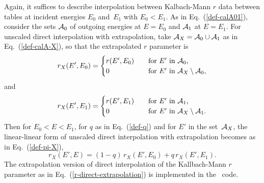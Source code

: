 {Again, it suffices to describe interpolation between Kalbach-Mann $r$
data between tables at incident energies $E_0$ and~$E_1$ with
$E_0 < E_1$.  As in Eq.~(\ref{def-calA01}),
consider the sets ${\cal A}_0$ of outgoing energies
at $E = E_0$ and ${\cal A}_1$ at $E = E_1$.  For unscaled direct interpolation
with extrapolation, take ${\cal A}_X = {\cal A}_0 \cup {\cal A}_1$ as in
Eq.~(\ref{def-calA-X}), so that the extrapolated $r$ parameter is
\begin{equation*}
  r_X(E', E_0 ) = \begin{cases}
    r(E', E_0 ) &\quad \text{for $E'$ in ${\cal A}_0$,} \\
    0 &\quad \text{for $E'$ in ${\cal A}_X \setminus {\cal A}_0$,}
  \end{cases}
\end{equation*}
and
\begin{equation*}
  r_X(E', E_1 ) = \begin{cases}
    r(E', E_1 ) &\quad \text{for $E'$ in ${\cal A}_1$,} \\
    0 &\quad \text{for $E'$ in ${\cal A}_X \setminus {\cal A}_1$.}
  \end{cases}
\end{equation*}
Then for $E_0 < E < E_1$, for $q$ as in Eq.~(\ref{def-q}) and for
$E'$ in the set~${\cal A}_X$, the linear-linear form of unscaled direct interpolation
with extrapolation becomes as in Eq.~(\ref{def-pi-X}),
\begin{equation}
  r_X(E', E ) = ( 1 - q )\, r_X(E', E_0 ) + q\, r_X(E', E_1 ).
  \label{r-direct-extrapolation}
\end{equation}
The extrapolation version of direct interpolation of the Kallbach-Mann
$r$ parameter as in Eq.~(\ref{r-direct-extrapolation}) is implemented in
the \gettransfer\ code.

}
